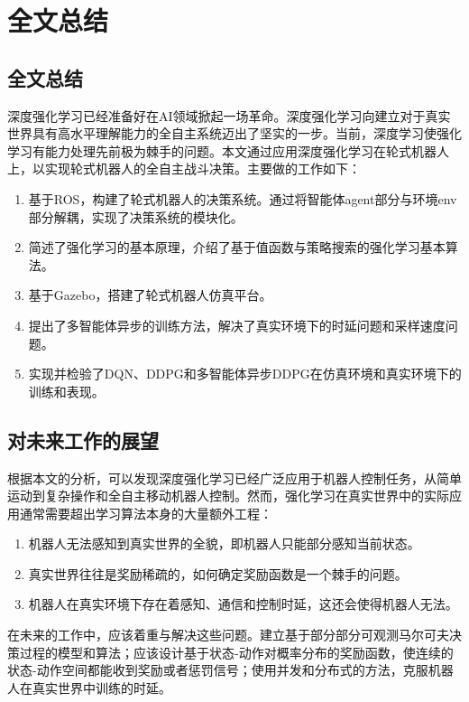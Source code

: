 ﻿%
%
%

\renewcommand{\baselinestretch}{1.5}
\fontsize{12pt}{13pt}\selectfont

\chapter{全文总结}\label{conclusion}
\section{全文总结}
深度强化学习已经准备好在AI领域掀起一场革命。深度强化学习向建立对于真实世界具有高水平理解能力的全自主系统迈出了坚实的一步。当前，深度学习使强化学习有能力处理先前极为棘手的问题。本文通过应用深度强化学习在轮式机器人上，以实现轮式机器人的全自主战斗决策。主要做的工作如下：
\vspace{-10pt}
\begin{enumerate}
  \item 基于ROS，构建了轮式机器人的决策系统。通过将智能体agent部分与环境env部分解耦，实现了决策系统的模块化。
  \item 简述了强化学习的基本原理，介绍了基于值函数与策略搜索的强化学习基本算法。
  \item 基于Gazebo，搭建了轮式机器人仿真平台。
  \item 提出了多智能体异步的训练方法，解决了真实环境下的时延问题和采样速度问题。
  \item 实现并检验了DQN、DDPG和多智能体异步DDPG在仿真环境和真实环境下的训练和表现。
\end{enumerate}

\section{对未来工作的展望}
根据本文的分析，可以发现深度强化学习已经广泛应用于机器人控制任务，从简单运动到复杂操作和全自主移动机器人控制。然而，强化学习在真实世界中的实际应用通常需要超出学习算法本身的大量额外工程：
\vspace{-10pt}
\begin{enumerate}
  \item 机器人无法感知到真实世界的全貌，即机器人只能部分感知当前状态。
  \item 真实世界往往是奖励稀疏的，如何确定奖励函数是一个棘手的问题。
  \item 机器人在真实环境下存在着感知、通信和控制时延，这还会使得机器人无法。
\end{enumerate}

在未来的工作中，应该着重与解决这些问题。建立基于部分部分可观测马尔可夫决策过程的模型和算法；应该设计基于状态-动作对概率分布的奖励函数，使连续的状态-动作空间都能收到奖励或者惩罚信号；使用并发和分布式的方法，克服机器人在真实世界中训练的时延。

